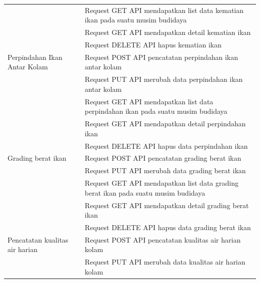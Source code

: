 \begin{enumerate}
\begin{longtable}{| p{3cm} | p{10cm} |}
                                 & Request GET API mendapatkan list data kematian ikan pada suatu musim budidaya                \\ \cline{2-2}
                                 & Request GET API mendapatkan detail kematian ikan                                             \\ \cline{2-2}
                                 & Request DELETE API hapus kematian ikan                                                          \\ \hline
Perpindahan Ikan Antar Kolam     & Request POST API pencatatan perpindahan ikan antar kolam                                      \\ \cline{2-2}
                                 & Request PUT API merubah data perpindahan ikan antar kolam                                    \\ \cline{2-2}
                                 & Request GET API mendapatkan list data perpindahan ikan pada suatu musim budidaya             \\ \cline{2-2}
                                 & Request GET API mendapatkan detail perpindahan ikan                                          \\ \cline{2-2}
                                 & Request DELETE API hapus data perpindahan ikan                                                  \\ \hline
Grading berat ikan               & Request POST API pencatatan grading berat ikan                                                \\ \cline{2-2}
                                 & Request PUT API merubah data grading berat ikan                                              \\ \cline{2-2}
                                 & Request GET API mendapatkan list data grading berat ikan pada suatu musim budidaya           \\ \cline{2-2}
                                 & Request GET API mendapatkan detail grading berat ikan                                        \\ \cline{2-2}
                                 & Request DELETE API hapus data grading berat ikan                                                \\ \hline
Pencatatan kualitas air harian   & Request POST API pencatatan kualitas air harian kolam                                         \\ \cline{2-2}
                                 & Request PUT API merubah data kualitas air harian kolam                                       \\ \cline{2-2}

\end{longtable}
\end{enumerate}
